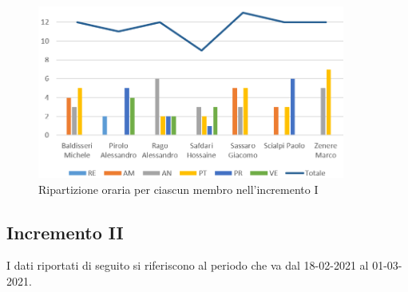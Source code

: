 \begin{figure}[!htb]   
    \centering
    \includegraphics[width=0.9\textwidth]{Images/per2}
	\caption{Ripartizione oraria per ciascun membro nell'incremento I}
\end{figure}

\subsection{Incremento II}
I dati riportati di seguito si riferiscono al periodo che va dal 18-02-2021 al 01-03-2021.

